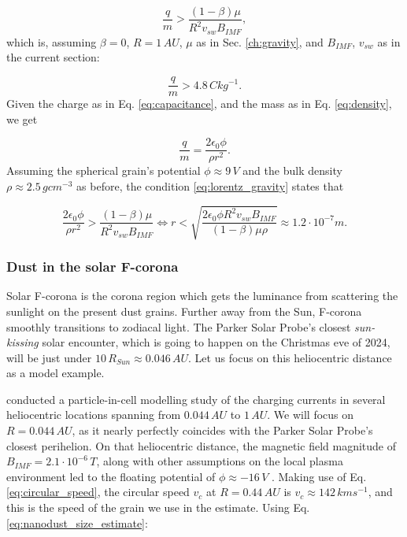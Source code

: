 \begin{equation}
    \frac{q}{m} > \frac{(1-\beta)\mu}{R^2 v_{sw} B_{IMF}},
\end{equation}
which is, assuming $\beta = 0$, $R = 1 \, \si{AU}$, $\mu$ as in Sec. \ref{ch:gravity}, and $B_{IMF}$, $v_{sw}$ as in the current section:

\begin{equation}
    \frac{q}{m} >  4.8 \, \si{C kg^{-1}}.
\end{equation}
Given the charge as in Eq. \ref{eq:capacitance}, and the mass as in Eq. \ref{eq:density}, we get

\begin{equation}
    \frac{q}{m} = \frac{2 \epsilon_0 \phi}{\rho r^2}.
\end{equation}
Assuming the spherical grain's potential $\phi \approx 9 \, \si{V}$ and the bulk density $\rho \approx 2.5 \, \si{g cm^{-3}}$ as before, the condition \ref{eq:lorentz_gravity} states that 

\begin{equation}
    \frac{2 \epsilon_0 \phi}{\rho r^2} > \frac{(1-\beta)\mu}{R^2 v_{sw} B_{IMF}} \Leftrightarrow 
    r < \sqrt{\frac{2 \epsilon_0 \phi R^2 v_{sw} B_{IMF}}{(1-\beta) \mu \rho}} \approx 
    1.2 \cdot 10^{-7} \si{m}.
    \label{eq:nanodust_size_estimate}
\end{equation}

\subsubsection{Dust in the solar F-corona}

Solar F-corona is the corona region which gets the luminance from scattering the sunlight on the present dust grains. Further away from the Sun, F-corona smoothly transitions to zodiacal light. The Parker Solar Probe's closest \textit{sun-kissing} solar encounter, which is going to happen on the Christmas eve of 2024, will be just under $10 \, R_{Sun} \approx 0.046 \, \si{AU}$. Let us focus on this heliocentric distance as a model example. 

\citeauthor{guillemant2013simulation} conducted a particle-in-cell modelling study of the charging currents in several heliocentric locations \citep{guillemant2013simulation} spanning from $0.044 \, \si{AU}$ to $1 \, \si{AU}$. We will focus on $R = 0.044 \, \si{AU}$, as it nearly perfectly coincides with the Parker Solar Probe's closest perihelion. On that heliocentric distance, the magnetic field magnitude of $B_{IMF} = 2.1 \cdot 10^{-6} \, \si{T}$, along with other assumptions on the local plasma environment led to the floating potential of $\phi \approx -16 \, \si{V}$ \citep{guillemant2013simulation}. Making use of Eq. \ref{eq:circular_speed}, the circular speed $v_c$ at $R = 0.44 \, \si{AU}$ is $v_c \approx 142 \, \si{km s^{-1}}$, and this is the speed of the grain we use in the estimate. Using Eq. \ref{eq:nanodust_size_estimate}:

